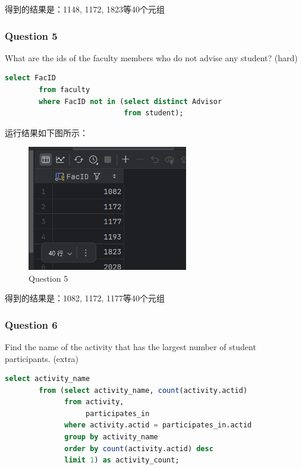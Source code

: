 \documentclass{article}
\begin{document}
    得到的结果是：1148, 1172, 1823等40个元组
    
    \subsubsection{Question 5}
    
    What are the ids of the faculty members who do not advise any student?  (hard)
    
    \begin{lstlisting}[language=sql, title=Question 5, tabsize=4]
    	select FacID
    	from faculty
    	where FacID not in (select distinct Advisor
    						from student);
    \end{lstlisting}
    
    运行结果如下图所示：
    
    \begin{figure}[H]
    	\centering
    	\includegraphics[width=7cm]{./images/8.Question5.png}
    	\caption{Question 5}
    \end{figure}
    
    得到的结果是：1082, 1172, 1177等40个元组
    
    \subsubsection{Question 6}
    
    Find the name of the activity that has the largest number of student participants.  (extra)
    
    \begin{lstlisting}[language=sql, title=Question 6, tabsize=4]
    	select activity_name
    	from (select activity_name, count(activity.actid)
    		  from activity,
    		  	   participates_in
    		  where activity.actid = participates_in.actid
    		  group by activity_name
    		  order by count(activity.actid) desc
    		  limit 1) as activity_count;
    \end{lstlisting}
    
\end{document}
